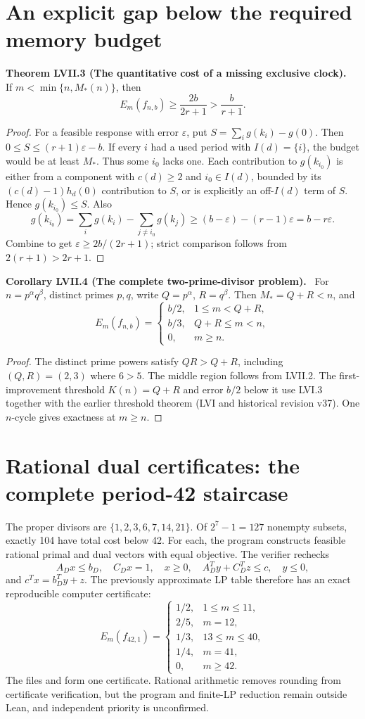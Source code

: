 \documentclass[11pt,a4paper,oneside]{book}
\newcommand{\statement}[3]{\par\medskip\noindent\textbf{#1 #2 (#3).}\ }
\begin{document}
\section{An explicit gap below the required memory budget}
\statement{Theorem}{LVII.3}{The quantitative cost of a missing exclusive clock}
If $m<\min\{n,M_*(n)\}$, then
\begin{equation}E_m(f_{n,b})\ge\frac{2b}{2r+1}>\frac b{r+1}.\tag{352}\end{equation}
\begin{proof}
For a feasible response with error $\varepsilon$, put $S=\sum_ig(k_i)-g(0)$. Then $0\le S\le(r+1)\varepsilon-b$. If every $i$ had a used period with $I(d)=\{i\}$, the budget would be at least $M_*$. Thus some $i_0$ lacks one. Each contribution to $g(k_{i_0})$ is either from a component with $c(d)\ge2$ and $i_0\in I(d)$, bounded by its $(c(d)-1)h_d(0)$ contribution to $S$, or is explicitly an off-$I(d)$ term of $S$. Hence $g(k_{i_0})\le S$. Also
\[g(k_{i_0})=\sum_ig(k_i)-\sum_{j\ne i_0}g(k_j)\ge(b-\varepsilon)-(r-1)\varepsilon=b-r\varepsilon.\]
Combine to get $\varepsilon\ge2b/(2r+1)$; strict comparison follows from $2(r+1)>2r+1$.
\end{proof}
\statement{Corollary}{LVII.4}{The complete two-prime-divisor problem}
For $n=p^\alpha q^\beta$, distinct primes $p,q$, write $Q=p^\alpha$, $R=q^\beta$. Then $M_*=Q+R<n$, and
\[E_m(f_{n,b})=\begin{cases}b/2,&1\le m<Q+R,\\b/3,&Q+R\le m<n,\\0,&m\ge n.\end{cases}\]
\begin{proof}
The distinct prime powers satisfy $QR>Q+R$, including $(Q,R)=(2,3)$ where $6>5$. The middle region follows from LVII.2. The first-improvement threshold $K(n)=Q+R$ and error $b/2$ below it use LVI.3 together with the earlier threshold theorem (LVI and historical revision v37). One $n$-cycle gives exactness at $m\ge n$.
\end{proof}
\section{Rational dual certificates: the complete period-42 staircase}
The proper divisors are $\{1,2,3,6,7,14,21\}$. Of $2^7-1=127$ nonempty subsets, exactly 104 have total cost below 42. For each, the program constructs feasible rational primal and dual vectors with equal objective. The verifier rechecks
\[A_Dx\le b_D,\quad C_Dx=1,\quad x\ge0,\quad A_D^Ty+C_D^Tz\le c,\quad y\le0,\]
and $c^Tx=b_D^Ty+z$. The previously approximate LP table therefore has an exact reproducible computer certificate:
\[E_m(f_{42,1})=\begin{cases}1/2,&1\le m\le11,\\2/5,&m=12,\\1/3,&13\le m\le40,\\1/4,&m=41,\\0,&m\ge42.\end{cases}\]
The files  and  form one certificate. Rational arithmetic removes rounding from certificate verification, but the program and finite-LP reduction remain outside Lean, and independent priority is unconfirmed.
\end{document}
